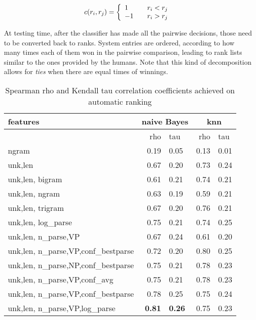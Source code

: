 \documentclass[11pt]{article}
\begin{document}
\[
c(r_i, r_j) = \left\{
  \begin{array}{l l}
    1 & \quad r_i < r_j \\
    -1 & \quad r_i > r_j \\
  \end{array} \right.
\] 

At testing time, after the classifier has made all the pairwise decisions, those
need to be converted back to ranks. System entries are ordered, according to how
many times each of them won in the pairwise comparison, leading to rank lists
similar to the ones provided by the humans. Note that this kind of
decomposition allows for \textit{ties} when there are equal times of winnings. %

\begin{table*}[h!]
\begin{center}
\begin{tabular}{|l|rl|rl|}
\hline
features & \multicolumn{2}{c|}{ naive Bayes } &  \multicolumn{2}{c|}{ knn }  \\
\hline
& rho & tau & rho & tau \\
\hline
ngram & 0.19 & 0.05 & 0.13 & 0.01  \\
unk,len & 0.67 & 0.20 & 0.73 & 0.24  \\
unk,len, bigram & 0.61 & 0.21 & 0.74 & 0.21 \\
unk,len, ngram & 0.63 & 0.19 & 0.59 & 0.21  \\
unk,len, trigram & 0.67 & 0.20 & 0.76 & 0.21  \\
unk,len, log_{parse} & 0.75 & 0.21 & 0.74 & 0.25 \\
\hline
unk,len, n_parse,VP & 0.67 & 0.24 & 0.61 & 0.20  \\
unk,len, n_parse,VP,conf_{bestparse} & 0.72 & 0.20 & 0.80 & 0.25  \\
unk,len, n_parse,NP,conf_{bestparse} & 0.75 & 0.21 & 0.78 & 0.23  \\
\hline
unk,len, n_parse,VP,conf_{avg} & 0.75 & 0.21 & 0.78 & 0.23 \\
unk,len, n_parse,VP,conf_{bestparse} & 0.78 & 0.25 & 0.75 & 0.24 \\
unk,len, n_parse,VP,log_{parse} & \textbf{0.81} & \textbf{0.26} & 0.75 & 0.23  \\
\hline
\end{tabular}
\end{center}
\caption{\label{font-table} Spearman rho and Kendall tau correlation
coefficients achieved on automatic ranking}
\end{table*}
\end{document}
